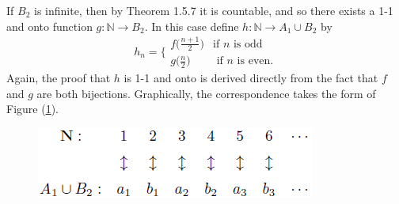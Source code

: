 \documentclass{article}
\begin{document}
            If $B_2$ is infinite, then by Theorem 1.5.7 it is countable, and so there exists a 1-1 and onto function $g: \mathbb{N} \to B_2$. In this case define $h: \mathbb{N} \to A_1 \cup B_2$ by
            \begin{equation*}
                h_n = \bigg\{ \begin{matrix} f\big(\frac{n+1}{2}\big) & \text{if $n$ is odd} \\
                g\big(\frac{n}{2}\big) & \text{ if $n$ is even.}\end{matrix}
            \end{equation*}
            Again, the proof that $h$ is 1-1 and onto is derived directly from the fact that $f$ and $g$ are both bijections. Graphically, the correspondence takes the form of Figure (\ref{theorem1.5.8}).
            \begin{figure}[ht!]
                \centering
                \includegraphics[width=0.5\linewidth]{figs/theorem1.5.8.png}
                \caption{}
                \label{theorem1.5.8}
            \end{figure}
            
\end{document}
